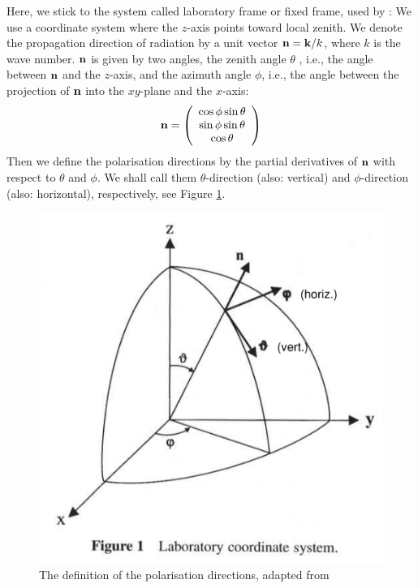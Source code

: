Here, we stick to the system called laboratory frame or fixed frame, used by
\citet{Mishchenko:02}: We use a coordinate system where the $z$-axis points
toward local zenith. We denote the propagation direction of radiation by a unit
vector $\mathbf{n} = \mathbf{k}/k$, where $k$ is the wave number. $\mathbf{n}$
is given by two angles, the zenith angle $\theta$ , i.e., the angle between
$\mathbf{n}$ and the $z$-axis, and the azimuth angle $\phi$, i.e., the angle
between the projection of $\mathbf{n}$ into the $xy$-plane and the $x$-axis:
\begin{equation}
  \label{eq:polarization:propdir}
   \VctStl{n} = \ColVct{\cos\phi \sin\theta}%
                       {\sin\phi \sin\theta}%
                       { \cos\theta}                    
\end{equation}
Then we define the polarisation directions by the partial derivatives
of  $\mathbf{n}$ with respect to $\theta$ and $\phi$. We shall call
them $\theta$-direction (also: vertical) and $\phi$-direction (also:
horizontal), respectively, see
Figure \ref{fig:polarization:directions}. 
\begin{figure}
 \begin{center}
  \begin{minipage}[c]{0.9\textwidth}
   \begin{center}
    \includegraphics*[width=0.9\hsize]{pol_directions}
   \end{center}
  \end{minipage}
  \begin{minipage}[c]{0.9\textwidth}
   \caption{The definition of the polarisation directions, adapted
     from \citet{Mishchenko:02}}
   \label{fig:polarization:directions}
  \end{minipage}
 \end{center}
\end{figure}   
